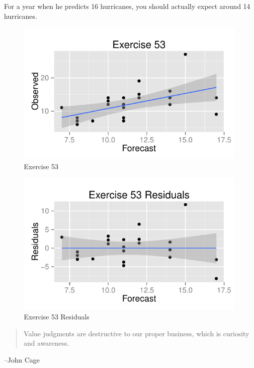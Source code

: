\documentclass[letterpaper, landscape]{exam}
\begin{document}
\begin{description}
        For a year when he predicts 16 hurricanes, you should actually expect
        around 14 hurricanes.

        \begin{figure}[H]
          \centering
          \includegraphics{figures/ex53.pdf}
          \caption{Exercise 53}
        \end{figure}

        \begin{figure}[H]
          \centering
          \includegraphics{figures/ex53_residuals.pdf}
          \caption{Exercise 53 Residuals}
        \end{figure}

    \end{description}

  \else
    \vspace{12 cm}
    \begin{quote}
      \begin{em}
        Value judgments are destructive to our proper business, which is
        curiosity and awareness. 
      \end{em}
    \end{quote}
    \hspace{1 cm} --John Cage
  \fi
\end{document}
